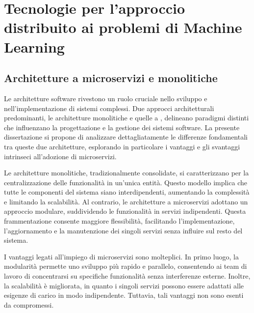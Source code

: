 % 
% 
% 



\clearpage
\cleardoublepage

\chapter{Tecnologie per l'approccio distribuito ai problemi di Machine Learning}

\section{Architetture a microservizi e monolitiche}

Le architetture software rivestono un ruolo cruciale nello sviluppo e nell'implementazione di sistemi complessi. Due approcci architetturali predominanti, le architetture monolitiche e quelle a , delineano paradigmi distinti che influenzano la progettazione e la gestione dei sistemi software. La presente dissertazione si propone di analizzare dettagliatamente le differenze fondamentali tra queste due architetture, esplorando in particolare i vantaggi e gli svantaggi intrinseci all'adozione di microservizi.


Le architetture monolitiche, tradizionalmente consolidate, si caratterizzano per la centralizzazione delle funzionalità in un'unica entità. Questo modello implica che tutte le componenti del sistema siano interdipendenti, aumentando la complessità e limitando la scalabilità. Al contrario, le architetture a microservizi adottano un approccio modulare, suddividendo le funzionalità in servizi indipendenti. Questa frammentazione consente maggiore flessibilità, facilitando l'implementazione, l'aggiornamento e la manutenzione dei singoli servizi senza influire sul resto del sistema.

I vantaggi legati all'impiego di microservizi sono molteplici. In primo luogo, la modularità permette uno sviluppo più rapido e parallelo, consentendo ai team di lavoro di concentrarsi su specifiche funzionalità senza interferenze esterne. Inoltre, la scalabilità è migliorata, in quanto i singoli servizi possono essere adattati alle esigenze di carico in modo indipendente. Tuttavia, tali vantaggi non sono esenti da compromessi.

